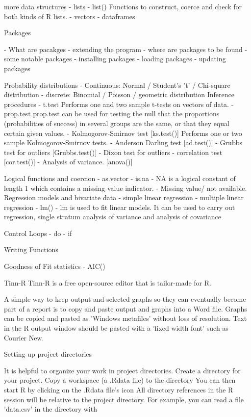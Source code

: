 \documentclass[a4paper,12pt]{article}
\begin{document}
more data structures
 - lists
   - list() Functions to construct, coerce and check for both kinds of R lists. 
 - vectors
 - dataframes
 
Packages

 - What are pacakges
- extending the program
 - where are packages to be found
 - some notable packages
 - installing packages
 - loading packages
 - updating packages
 
Probability distributions
 - Continuous: Normal / Student's 't' / Chi-square distribution
 - discrete: Binomial / Poisson / geometric distribution
Inference procedures
 - t.test
Performs one and two sample t-tests on vectors of data. 
 - prop.test
	    prop.test can be used for testing the null that the proportions (probabilities of success) in several groups are the same, or that they equal certain given values.
 - Kolmogorov-Smirnov test      [ks.test()]
Performs one or two sample Kolmogorov-Smirnov tests. 
 - Anderson Darling test        [ad.test()]
 - Grubbs test for outliers     [Grubbs.test()]
 - Dixon test for outliers
 - correlation test [cor.test()]
 - Analysis of variance. [anova()]
 

Logical functions and coercion
 - as.vector
 - is.na
 - NA is a logical constant of length 1 which contains a missing value indicator.
 - Missing value/ not available. 
Regression models and bivariate data
 - simple linear regression 
 - multiple linear regression 
 - lm()
 - lm is used to fit linear models. It can be used to carry out regression, single stratum analysis of variance and analysis of covariance 

Control Loops
 - do 
 - if 

Writing Functions

Goodness of Fit statistics
 - AIC()




Tinn-R
Tinn-R is a free open-source editor that is tailor-made for R. 

A simple way to keep output and selected graphs so they can eventually become part of a report is to copy and paste output and graphs into a Word file. Graphs can be copied and pasted as 'Windows metafiles' without loss of resolution. Text in the R output window should be pasted with a 'fixed width font' such as Courier New.

Setting up project directories

It is helpful to organize your work in project directories.
Create a directory for your project.
Copy a workspace (a .Rdata file) to the directory
You can then start R by clicking on the .Rdata file's icon
All directory references in the R session will be relative to the project directory. For example, you can read a file 'data.csv' in the directory with
\end{document}
